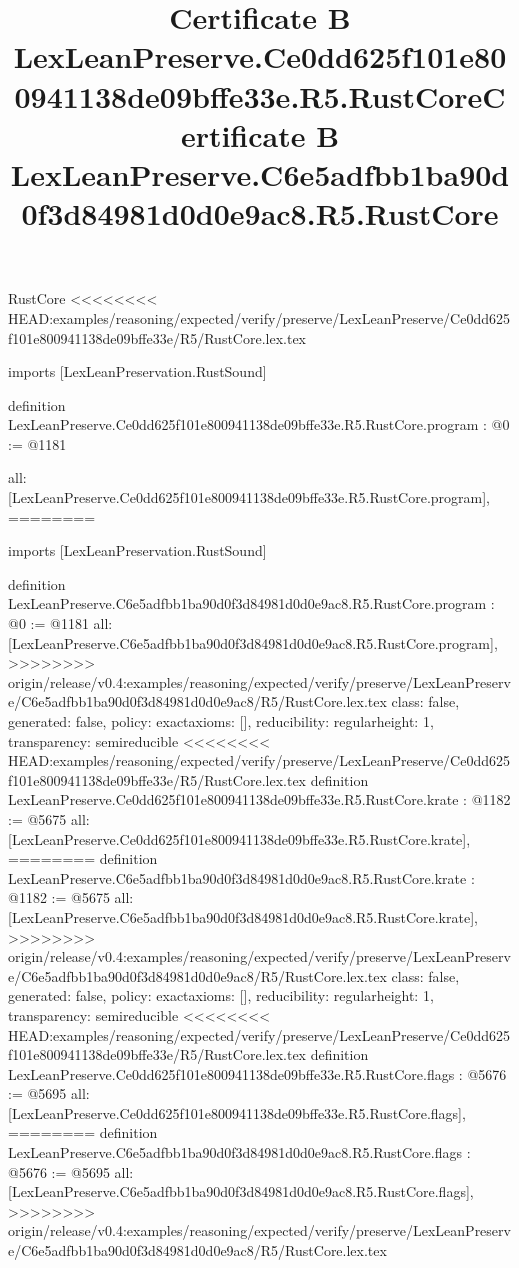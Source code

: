 \begin{lexlean}{RustCore}
<<<<<<<< HEAD:examples/reasoning/expected/verify/preserve/LexLeanPreserve/Ce0dd625f101e800941138de09bffe33e/R5/RustCore.lex.tex
\title{Certificate B LexLeanPreserve.Ce0dd625f101e800941138de09bffe33e.R5.RustCore}
\begin{coremodule}
imports [LexLeanPreservation.RustSound]

definition LexLeanPreserve.Ce0dd625f101e800941138de09bffe33e.R5.RustCore.program : @0 := @1181 {
  all: [LexLeanPreserve.Ce0dd625f101e800941138de09bffe33e.R5.RustCore.program],
========
\title{Certificate B LexLeanPreserve.C6e5adfbb1ba90d0f3d84981d0d0e9ac8.R5.RustCore}
\begin{coremodule}
imports [LexLeanPreservation.RustSound]

definition LexLeanPreserve.C6e5adfbb1ba90d0f3d84981d0d0e9ac8.R5.RustCore.program : @0 := @1181 {
  all: [LexLeanPreserve.C6e5adfbb1ba90d0f3d84981d0d0e9ac8.R5.RustCore.program],
>>>>>>>> origin/release/v0.4:examples/reasoning/expected/verify/preserve/LexLeanPreserve/C6e5adfbb1ba90d0f3d84981d0d0e9ac8/R5/RustCore.lex.tex
  class: false,
  generated: false,
  policy: exact{axioms: []},
  reducibility: regular{height: 1},
  transparency: semireducible
}
<<<<<<<< HEAD:examples/reasoning/expected/verify/preserve/LexLeanPreserve/Ce0dd625f101e800941138de09bffe33e/R5/RustCore.lex.tex
definition LexLeanPreserve.Ce0dd625f101e800941138de09bffe33e.R5.RustCore.krate : @1182 := @5675 {
  all: [LexLeanPreserve.Ce0dd625f101e800941138de09bffe33e.R5.RustCore.krate],
========
definition LexLeanPreserve.C6e5adfbb1ba90d0f3d84981d0d0e9ac8.R5.RustCore.krate : @1182 := @5675 {
  all: [LexLeanPreserve.C6e5adfbb1ba90d0f3d84981d0d0e9ac8.R5.RustCore.krate],
>>>>>>>> origin/release/v0.4:examples/reasoning/expected/verify/preserve/LexLeanPreserve/C6e5adfbb1ba90d0f3d84981d0d0e9ac8/R5/RustCore.lex.tex
  class: false,
  generated: false,
  policy: exact{axioms: []},
  reducibility: regular{height: 1},
  transparency: semireducible
}
<<<<<<<< HEAD:examples/reasoning/expected/verify/preserve/LexLeanPreserve/Ce0dd625f101e800941138de09bffe33e/R5/RustCore.lex.tex
definition LexLeanPreserve.Ce0dd625f101e800941138de09bffe33e.R5.RustCore.flags : @5676 := @5695 {
  all: [LexLeanPreserve.Ce0dd625f101e800941138de09bffe33e.R5.RustCore.flags],
========
definition LexLeanPreserve.C6e5adfbb1ba90d0f3d84981d0d0e9ac8.R5.RustCore.flags : @5676 := @5695 {
  all: [LexLeanPreserve.C6e5adfbb1ba90d0f3d84981d0d0e9ac8.R5.RustCore.flags],
>>>>>>>> origin/release/v0.4:examples/reasoning/expected/verify/preserve/LexLeanPreserve/C6e5adfbb1ba90d0f3d84981d0d0e9ac8/R5/RustCore.lex.tex
}}}
\end{coremodule}}
\end{coremodule}
\end{lexlean}
